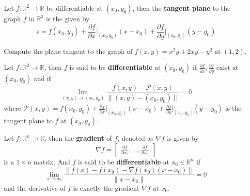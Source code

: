 \documentclass[openany]{book}
\newcommand{\R}{\mathbb{R}}
\begin{document}
\begin{defn}
    Let $f:\R^2\to\R$ be differentiable at $(x_0,y_0)$, then the \textbf{tangent plane} to the graph $f$ in $\R^3$ is the given by 
    \begin{equation*}
        z=f(x_0,y_0)+\frac{\partial f}{\partial x}\bigg\vert_{(x_0,y_0)}(x-x_0)+\frac{\partial f}{\partial y}\bigg\vert_{(x_0,y_0)}(y-y_0)
    \end{equation*}
\end{defn}

\begin{prob}
    Compute the plane tangent to the graph of $f(x,y)=x^2y+2xy-y^2$ at $(1,2)$.
\end{prob}

\begin{defn}
    Let $f:\R^2\to\R$, then $f$ is said to be \textbf{differentiable} at $(x_0,y_0)$ if $\frac{\partial f}{\partial x}, \frac{\partial f}{\partial y}$ exist at $(x_0,y_0)$ and if 
    \begin{equation*}
        \lim_{(x,y)\to(x_0,y_0)}\frac{f(x,y)-\mathcal{P}(x,y)}{\|(x,y)-(x_0,y_0)\|}=0
    \end{equation*}
    where $\mathcal{P}(x,y)=f(x_0,y_0)+\frac{\partial f}{\partial x}\bigg\vert_{(x_0,y_0)}(x-x_0)+\frac{\partial f}{\partial y}\bigg\vert_{(x_0,y_0)}(y-y_0)$ is the tangent plane to $f$ at $(x_0,y_0)$.
\end{defn}


\begin{defn}
    Let $f:\R^n\to\R$, then the \textbf{gradient} of $f$, denoted as $\nabla f$ is given by 
    \begin{equation*}
        \nabla f=\begin{bmatrix}
            \frac{\partial f}{\partial x_1}, \dots, \frac{\partial f}{\partial x_n}
        \end{bmatrix}
    \end{equation*}
    is a $1\times n$ matrix. And $f$ is said to be \textbf{differentiable} at $x_0\in\R^n$ if 
    \begin{equation*}
        \lim_{x\to x_0}\frac{\|f(x)-f(x_0)-\nabla f(x_0)(x-x_0)\|}{\|x-x_0\|}=0
    \end{equation*}
    and the derivative of $f$ is exactly the gradient $\nabla f$ at $x_0$.
\end{defn}
\end{document}
